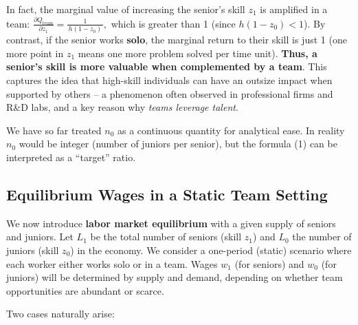 \documentclass[12pt]{article}
\begin{document}
In fact, the marginal value of increasing the senior's skill \(z_1\) is
amplified in a team:
\(\frac{\partial Q_{\text{team}}}{\partial z_1} = \frac{1}{\,h(1-z_0)\,},\)
which is greater than 1 (since \(h(1-z_0)<1\)). By contrast, if the
senior works \textbf{solo}, the marginal return to their skill is just 1
(one more point in \(z_1\) means one more problem solved per time unit).
\textbf{Thus, a senior's skill is more valuable when complemented by a
team}. This captures the idea that high-skill individuals can have an
outsize impact when supported by others -- a phenomenon often observed
in professional firms and R\&D labs, and a key reason why \emph{teams
leverage talent}.

We have so far treated \(n_0\) as a continuous quantity for analytical
ease. In reality \(n_0\) would be integer (number of juniors per
senior), but the formula (1) can be interpreted as a ``target'' ratio.

\subsection{Equilibrium Wages in a Static Team
Setting}\label{equilibrium-wages-in-a-static-team-setting}

We now introduce \textbf{labor market equilibrium} with a given supply
of seniors and juniors. Let \(L_1\) be the total number of seniors
(skill \(z_1\)) and \(L_0\) the number of juniors (skill \(z_0\)) in the
economy. We consider a one-period (static) scenario where each worker
either works solo or in a team. Wages \(w_1\) (for seniors) and \(w_0\)
(for juniors) will be determined by supply and demand, depending on
whether team opportunities are abundant or scarce.

Two cases naturally arise:
\end{document}
